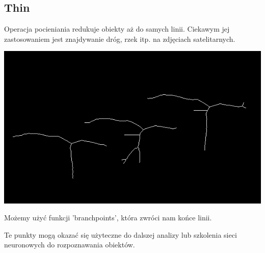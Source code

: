 \documentclass{article}
\begin{document}
	\subsection{Thin}
	Operacja pocieniania redukuje obiekty aż do samych linii.
	Ciekawym jej zastosowaniem jest znajdywanie dróg, rzek itp. na zdjęciach satelitarnych.
	\begin{center}
		\includegraphics[width=\linewidth]{../../lab05/kaczki_thin.png}
	\end{center}
	Możemy użyć funkcji 'branchpoints', która zwróci nam końce linii.
	
	Te punkty mogą okazać się użyteczne do dalszej analizy lub szkolenia sieci neuronowych do rozpoznawania obiektów.
	
\end{document}
